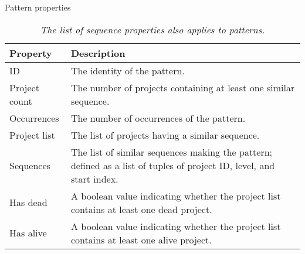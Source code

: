 \begin{table}[H]
\caption{Pattern properties}\label{table:pattern_props}
\caption*{\footnotesize\textit{The list of sequence properties also applies to
patterns.}}
\centering
\begin{tabular}{lp{10cm}}
\hline
	\textbf{Property} & \textbf{Description} \\
	\hline
	ID & The identity of the pattern. \\
	Project count & The number of projects containing at least one similar
	sequence. \\
	Occurrences & The number of occurrences of the pattern. \\
	Project list & The list of projects having a similar sequence. \\
	Sequences & The list of similar sequences making the pattern; defined as a list
	of tuples of project ID, level, and start index. \\
	Has dead & A boolean value indicating whether the project list contains at
	least one dead project. \\
	Has alive & A boolean value indicating whether the project list contains at
	least one alive project. \\
\hline
\end{tabular}
\end{table}